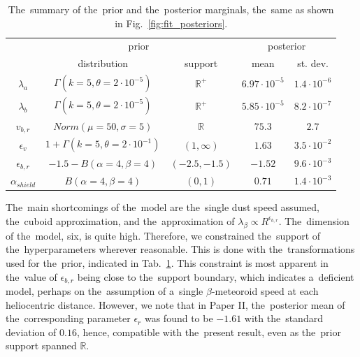 \begin{table}[t]
\caption{The~summary of the~prior and the~posterior marginals, the~same as shown in Fig.~\ref{fig:fit_posteriors}.}
\centering
\label{tab:prior_posterior}
\begin{tabular}{c|cc|cc}
\multicolumn{1}{c}{  } \vline & \multicolumn{2}{c}{prior} \vline & \multicolumn{2}{c}{posterior} \\ 
& distribution & support & mean & st. dev. \\
\hline
$\lambda_a$ & $\Gamma(k=5,\theta=2\cdot10^{-5})$ & $\mathbb{R}^+$ &
$6.97 \cdot 10^{-5}$ & $1.4 \cdot 10^{-6}$  \\
$\lambda_b$ & $\Gamma(k=5,\theta=2\cdot10^{-5})$ & $\mathbb{R}^+$ & 
$5.85 \cdot 10^{-5}$ & $8.2 \cdot 10^{-7}$  \\
$v_{b,r}$ & $Norm(\mu=50,\sigma=5)$ & $\mathbb{R}$ & 
$75.3$ & $2.7$  \\
$\epsilon_v$ & $1+\Gamma(k=5,\theta=2\cdot10^{-1})$ & $(1,\infty)$ &
$1.63$ & $3.5 \cdot 10^{-2}$  \\
$\epsilon_{b,r}$ & $-1.5-B(\alpha=4,\beta=4)$ & $(-2.5,-1.5)$ &
$-1.52$ & $9.6 \cdot 10^{-3}$  \\
$\alpha_{shield}$ & $B(\alpha=4,\beta=4)$ & $(0,1)$ & 
$0.71$ & $1.4 \cdot 10^{-3}$  \\
\hline
\end{tabular}
\end{table}

The~main shortcomings of the~model are the~single dust speed assumed, the~cuboid approximation, and the~approximation of $\lambda_\beta \propto R^{\epsilon_{b,r}}$. The~dimension of the~model, six, is quite high. Therefore, we constrained the~support of the~hyperparameters wherever reasonable. This is done with the~transformations used for the~prior, indicated in Tab.~\ref{tab:prior_posterior}. This constraint is most apparent in the~value of $\epsilon_{b,r}$ being close to the~support boundary, which indicates a~deficient model, perhaps on the~assumption of a~single $\beta$-meteoroid speed at each heliocentric distance. However, we note that in Paper II, the~posterior mean of the~corresponding parameter $\epsilon_r$ was found to be $-1.61$ with the~standard deviation of $0.16$, hence, compatible with the~present result, even as the~prior support spanned $\mathbb{R}$.

